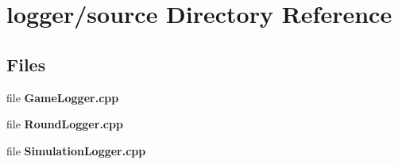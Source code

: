 \section{logger/source Directory Reference}
\label{dir_199e6b3c3d481fe4434c6e1e84f625d2}
\subsection*{Files}
\begin{DoxyCompactItemize}
\item 
file {\bfseries Game\-Logger.\-cpp}
\item 
file {\bfseries Round\-Logger.\-cpp}
\item 
file {\bfseries Simulation\-Logger.\-cpp}
\end{DoxyCompactItemize}
